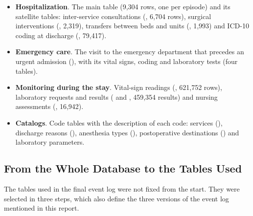 \begin{itemize}[leftmargin=*]
  \item \textbf{Hospitalization}. The main table  (9,304 rows, one per episode) and its satellite tables: inter-service consultations (, 6,704 rows), surgical interventions (, 2,319), transfers between beds and units (, 1,993) and ICD-10 coding at discharge (, 79,417).
  \item \textbf{Emergency care}. The visit to the emergency department that precedes an urgent admission (), with its vital signs, coding and laboratory tests (four tables).
  \item \textbf{Monitoring during the stay}. Vital-sign readings (, 621,752 rows), laboratory requests and results ( and , 459,354 results) and nursing assessments (, 16,942).
  \item \textbf{Catalogs}. Code tables with the description of each code: services (), discharge reasons (), anesthesia types (), postoperative destinations () and laboratory parameters.
\end{itemize}

\subsection{From the Whole Database to the Tables Used}
\label{sec:historia_tablas}

The tables used in the final event log were not fixed from the start. They were selected in three steps, which also define the three versions of the event log mentioned in this report.

